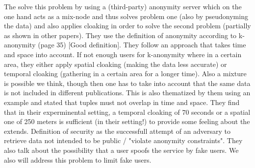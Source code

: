 The solve this problem by using a (third-party) anonymity server which on the one hand acts as a mix-node and thus solves problem one (also by pseudonyming the data) and also applies cloaking in order to solve the second problem (partially as shown in other papers). They use the definition of anonymity according to k-anonymity (page 35) [Good definition]. They follow an approach that takes time and space into account. If not enough users for k-anonymity where in a certain area, they either apply spatial cloaking (making the data less accurate) or temporal cloaking (gathering in a certain area for a longer time). Also a mixture is possible we think, though then one has to take into account that the same data is not included in different publications. This is also thematized by them using an example and stated that tuples must not overlap in time and space. They find that in their experminental setting, a temporal cloaking of 70 seconds or a spatial one of 250 meters is sufficient (in their setting!) to provide some feeling about the extends. Definition of security as the successfull attempt of an adversary to retrieve data not intended to be public / "violate anonymity constraints". They also talk about the possibility that a user spoofs the service by fake users. We also will address this problem to limit fake users.

